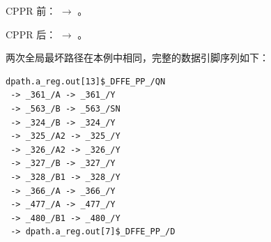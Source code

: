 CPPR 前： $\longrightarrow$ 。

CPPR 后： $\longrightarrow$ 。

两次全局最坏路径在本例中相同，完整的数据引脚序列如下：
\begin{lstlisting}[style=script,language={},numbers=none]
dpath.a_reg.out[13]$_DFFE_PP_/QN
 -> _361_/A -> _361_/Y
 -> _563_/B -> _563_/SN
 -> _324_/B -> _324_/Y
 -> _325_/A2 -> _325_/Y
 -> _326_/A2 -> _326_/Y
 -> _327_/B -> _327_/Y
 -> _328_/B1 -> _328_/Y
 -> _366_/A -> _366_/Y
 -> _477_/A -> _477_/Y
 -> _480_/B1 -> _480_/Y
 -> dpath.a_reg.out[7]$_DFFE_PP_/D
\end{lstlisting}
